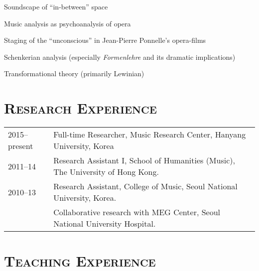 \documentclass[a4paper,11pt,draft]{article}
\begin{document}
  \hspace{2mm} \textbullet \hspace{2mm} Soundscape of ``in-between'' space
  
  \noindent \hspace{2mm} \textbullet \hspace{2mm} Music analysis as psychoanalysis of opera
   
  \noindent \hspace{2mm} \textbullet \hspace{2mm} Staging of the ``unconscious'' in Jean-Pierre Ponnelle's opera-films
  
  \noindent \hspace{2mm} \textbullet \hspace{2mm} Schenkerian analysis (especially \textit{Formenlehre} and its dramatic implications)
  
  \noindent \hspace{2mm} \textbullet \hspace{2mm} Transformational theory (primarily Lewinian)
  
  \section*{\textsc{Research Experience}}
  
  \hspace*{-0.25cm}
  \begin{tabular}{p{2.5cm} l}
    2015--present & Full-time Researcher, Music Research Center, Hanyang University, Korea\\
    
    2011--14 & Research Assistant I, School of Humanities (Music), The University of Hong Kong.\\
    
    2010--13 & Research Assistant, College of Music, Seoul National University, Korea.\\
    & Collaborative research with MEG Center, Seoul National University Hospital.
  \end{tabular}
  
  \vspace*{2.5mm}
  
  \section*{\textsc{Teaching Experience}}
  
\end{document}
